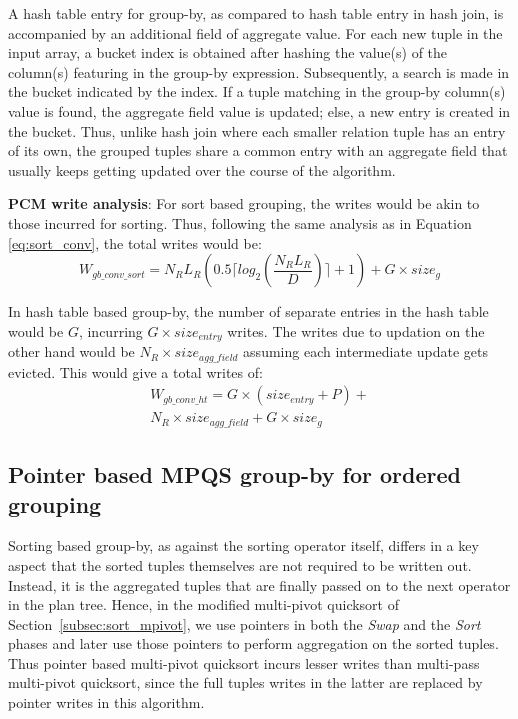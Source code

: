 A hash table entry for group-by, as compared to hash table entry in hash join, is accompanied by an additional field of aggregate value. For each new tuple in the input array, a bucket index is obtained after hashing the value(s) of the column(s) featuring in the group-by expression. Subsequently, a search is made in the bucket indicated by the index. If a tuple matching in the group-by column(s) value is found, the aggregate field value is updated; else, a new entry is created in the bucket. Thus, unlike hash join where each smaller relation tuple has an entry of its own, the grouped tuples share a common entry with an aggregate field that usually keeps getting updated over the course of the algorithm.

\textbf{PCM write analysis}: For sort based grouping, the writes would be akin to those incurred for sorting. Thus, following the same analysis as in Equation \ref{eq:sort_conv}, the total writes would be:
\begin{equation}
\label{eq:gby_conv_sort}
W_{gb\_conv\_sort} = N_RL_R (0.5 \lceil log_2(\frac{N_R L_R}{D}) \rceil + 1) + G \times size_g
\end{equation}	

In hash table based group-by, the number of separate entries in the hash table would be $G$, incurring $G \times size_{entry}$ writes. The writes due to updation on the other hand would be $N_R \times size_{agg\_field}$ assuming each intermediate update gets evicted. This would give a total writes of:
\begin{equation}
\label{eq:gby_conv_ht}
\begin{split}
W_{gb\_conv\_ht} = G \times (size_{entry} + P) + \\
N_R \times size_{agg\_field} + G \times size_g
\end{split}
\end{equation}

\subsection{Pointer based MPQS group-by for ordered grouping}
\label{subsec:gb_ptr_mpivot} 
Sorting based group-by, as against the sorting operator itself, differs in a key aspect that the sorted tuples themselves are not required to be written out. Instead, it is the aggregated tuples that are finally passed on to the next operator in the plan tree. Hence, in the modified multi-pivot quicksort of Section~\ref{subsec:sort_mpivot}, we use pointers in both the \textit{Swap} and the \textit{Sort} phases and later use those pointers to perform aggregation on the sorted tuples. Thus pointer based multi-pivot quicksort incurs lesser writes than multi-pass multi-pivot quicksort, since the full tuples writes in the latter are replaced by pointer writes in this algorithm.

